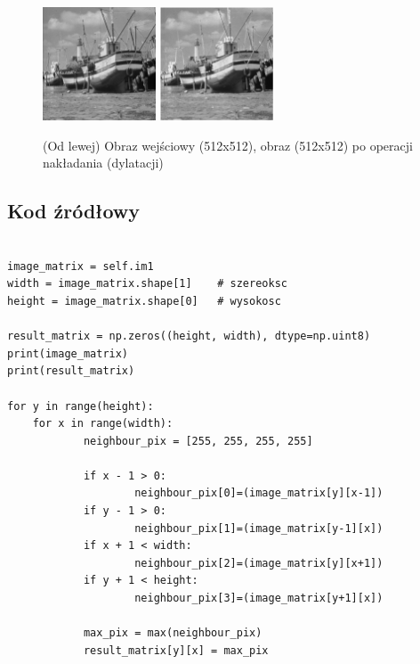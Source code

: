 \documentclass[final,a4paper,openany,12pt]{mwbk}
\begin{document}
\begin{figure}[H]
	\begin{center}
		\includegraphics[width=0.3\textwidth]{2/2Gray_D_Original}
		\includegraphics[width=0.3\textwidth]{2/2Gray_D_Result}
	\end{center}
	\caption{(Od lewej) Obraz wejściowy (512x512), obraz (512x512) po operacji nakładania (dylatacji)}
\end{figure}


\subsection*{Kod źródłowy}

\begin{lstlisting}[caption= Operacja nakładania (dylatacji) na obrazie szarym]

image_matrix = self.im1
width = image_matrix.shape[1]    # szereoksc
height = image_matrix.shape[0]   # wysokosc

result_matrix = np.zeros((height, width), dtype=np.uint8)
print(image_matrix)
print(result_matrix)

for y in range(height):
    for x in range(width):  
            neighbour_pix = [255, 255, 255, 255]

            if x - 1 > 0:
                    neighbour_pix[0]=(image_matrix[y][x-1])
            if y - 1 > 0:
                    neighbour_pix[1]=(image_matrix[y-1][x])
            if x + 1 < width:
                    neighbour_pix[2]=(image_matrix[y][x+1])
            if y + 1 < height:
                    neighbour_pix[3]=(image_matrix[y+1][x])

            max_pix = max(neighbour_pix)
            result_matrix[y][x] = max_pix      


\end{lstlisting}
\newpage
\end{document}
